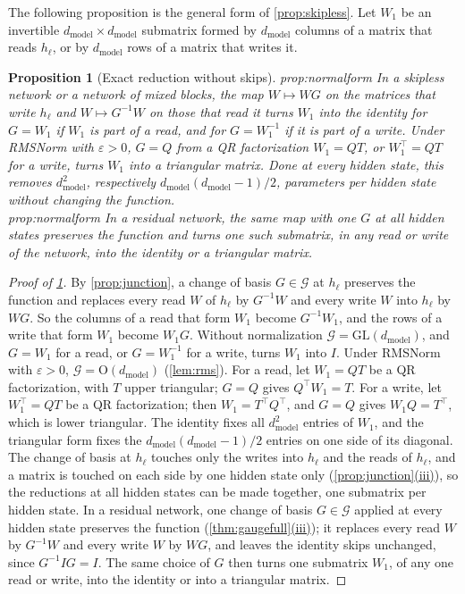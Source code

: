 \documentclass[10pt]{article}
\newtheorem{proposition}[theorem]{Proposition}
\theoremstyle{definition}
\theoremstyle{remark}
\newcommand{\dm}{d_{\mathrm{model}}}
\newcommand{\GL}{\mathrm{GL}}
\newcommand{\Ort}{\mathrm{O}}
\newcommand{\G}{\mathcal{G}}
\newcommand{\ptlabel}[1]{\phantomsection\label{#1}}
\DeclareRobustCommand{\cpref}[2]{\hyperref[#1:#2]{\cref*{#1}(#2)}}
\newcommand{\stpart}[3]{\ifx\relax#1\relax\else\ptlabel{#1:#2}\fi{\upshape\bfseries\boldmath(#2)\ifx\relax#3\relax\else\ #3.\fi}}
\begin{document}
The following proposition is the general form of \cref{prop:skipless}. Let $W_1$ be an invertible $\dm \times \dm$ submatrix formed by $\dm$ columns of a matrix that reads $h_\ell$, or by $\dm$ rows of a matrix that writes it.
\begin{proposition}[Exact reduction without skips]\label{prop:normalform}
\stpart{prop:normalform}{i}{} In a skipless network or a network of mixed blocks, the map $W \mapsto WG$ on the matrices that write $h_\ell$ and $W \mapsto G^{-1}W$ on those that read it turns $W_1$ into the identity for $G = W_1$ if $W_1$ is part of a read, and for $G = W_1^{-1}$ if it is part of a write. Under RMSNorm with $\varepsilon > 0$, $G = Q$ from a QR factorization $W_1 = QT$, or $W_1^\top = QT$ for a write, turns $W_1$ into a triangular matrix. Done at every hidden state, this removes $\dm^2$, respectively $\dm(\dm-1)/2$, parameters per hidden state without changing the function.\\
\stpart{prop:normalform}{ii}{} In a residual network, the same map with one $G$ at all hidden states preserves the function and turns one such submatrix, in any read or write of the network, into the identity or a triangular matrix.
\end{proposition}

\begin{proof}[Proof of \cref{prop:normalform}]
By \cref{prop:junction}, a change of basis $G \in \G$ at $h_\ell$ preserves the function and replaces every read $W$ of $h_\ell$ by $G^{-1}W$ and every write $W$ into $h_\ell$ by $WG$. So the columns of a read that form $W_1$ become $G^{-1}W_1$, and the rows of a write that form $W_1$ become $W_1G$. Without normalization $\G = \GL(\dm)$, and $G = W_1$ for a read, or $G = W_1^{-1}$ for a write, turns $W_1$ into $I$. Under RMSNorm with $\varepsilon > 0$, $\G = \Ort(\dm)$ (\cref{lem:rms}). For a read, let $W_1 = QT$ be a QR factorization, with $T$ upper triangular; $G = Q$ gives $Q^\top W_1 = T$. For a write, let $W_1^\top = QT$ be a QR factorization; then $W_1 = T^\top Q^\top$, and $G = Q$ gives $W_1Q = T^\top$, which is lower triangular. The identity fixes all $\dm^2$ entries of $W_1$, and the triangular form fixes the $\dm(\dm-1)/2$ entries on one side of its diagonal. The change of basis at $h_\ell$ touches only the writes into $h_\ell$ and the reads of $h_\ell$, and a matrix is touched on each side by one hidden state only (\cpref{prop:junction}{iii}), so the reductions at all hidden states can be made together, one submatrix per hidden state. In a residual network, one change of basis $G \in \G$ applied at every hidden state preserves the function (\cpref{thm:gaugefull}{iii}); it replaces every read $W$ by $G^{-1}W$ and every write $W$ by $WG$, and leaves the identity skips unchanged, since $G^{-1}IG = I$. The same choice of $G$ then turns one submatrix $W_1$, of any one read or write, into the identity or into a triangular matrix.
\end{proof}
\end{document}
